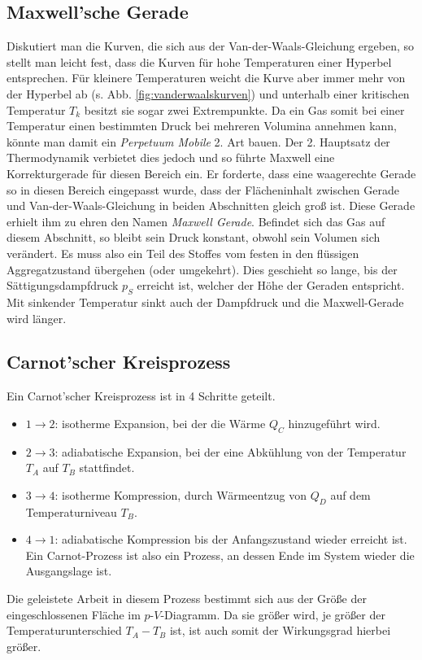 \documentclass[12pt,a4paper,titlepage,headinclude,bibtotoc]{scrartcl}
\begin{document}
\subsection{Maxwell'sche Gerade}
Diskutiert man die Kurven, die sich aus der Van-der-Waals-Gleichung ergeben, so stellt man leicht fest, dass die Kurven für hohe Temperaturen einer Hyperbel entsprechen.
Für kleinere Temperaturen weicht die Kurve aber immer mehr von der Hyperbel ab (s. Abb. \ref{fig:vanderwaalskurven}) und unterhalb einer kritischen Temperatur $T_k$ besitzt sie sogar zwei Extrempunkte.
Da ein Gas somit bei einer Temperatur einen bestimmten Druck bei mehreren Volumina annehmen kann, könnte man damit ein \emph{Perpetuum Mobile} 2. Art bauen.
Der 2. Hauptsatz der Thermodynamik verbietet dies jedoch und so führte Maxwell eine Korrekturgerade für diesen Bereich ein.
Er forderte, dass eine waagerechte Gerade so in diesen Bereich eingepasst wurde, dass der Flächeninhalt zwischen Gerade und Van-der-Waals-Gleichung in beiden Abschnitten gleich groß ist.
Diese Gerade erhielt ihm zu ehren den Namen \emph{Maxwell Gerade}.
Befindet sich das Gas auf diesem Abschnitt, so bleibt sein Druck konstant, obwohl sein Volumen sich verändert.
Es muss also ein Teil des Stoffes vom festen in den flüssigen Aggregatzustand übergehen (oder umgekehrt).
Dies geschieht so lange, bis der Sättigungsdampfdruck $p_S$ erreicht ist, welcher der Höhe der Geraden entspricht.
Mit sinkender Temperatur sinkt auch der Dampfdruck und die Maxwell-Gerade wird länger.
%

\subsection{Carnot'scher Kreisprozess}
Ein Carnot'scher Kreisprozess ist in 4 Schritte geteilt.
\begin{itemize}
	\item $1\rightarrow 2$: isotherme Expansion, bei der die Wärme $Q_C$ hinzugeführt wird.
	\item $2\rightarrow 3$: adiabatische Expansion, bei der eine Abkühlung von der Temperatur $T_A$ auf $T_B$ stattfindet.
	\item $3\rightarrow 4$: isotherme Kompression, durch Wärmeentzug von $Q_D$ auf dem Temperaturniveau $T_B$.
	\item $4\rightarrow 1$: adiabatische Kompression bis der Anfangszustand wieder erreicht ist.
		Ein Carnot-Prozess ist also ein Prozess, an dessen Ende im System wieder die Ausgangslage ist.
\end{itemize}
Die geleistete Arbeit in diesem Prozess bestimmt sich aus der Größe der eingeschlossenen Fläche im $p$-$V$-Diagramm.
Da sie größer wird, je größer der Temperaturunterschied $T_A-T_B$ ist, ist auch somit der Wirkungsgrad hierbei größer.
\end{document}
